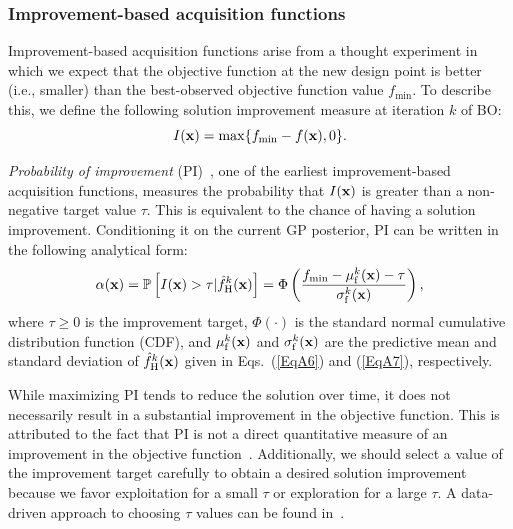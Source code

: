 \documentclass[iicol,sn-basic]{sn-jnl}%
\newcommand{\edit}[1]{\textcolor{red}{#1}} %
\begin{document}
\subsubsection{Improvement-based acquisition functions}\label{Sec511}

Improvement-based acquisition functions arise from a thought experiment in which we expect that the objective function at the new design point is better (i.e., smaller) than the best-observed objective function value $f_\text{min}$.
To describe this, we define the following solution improvement measure at iteration $k$ of BO:
\begin{equation}\label{Eq40}
	I({\bf x}) = \max\{f_\text{min}-f({\bf x}),0\}.
\end{equation}

\textit{Probability of improvement} (PI)~\citep{Kushner1964}, one of the earliest improvement-based acquisition functions, measures the probability that $I({\bf x})$ is greater than a non-negative target value $\tau$.
This is equivalent to the chance of having a solution improvement.
Conditioning it on the current GP posterior, PI can be written in the following analytical form:
\begin{equation}\label{Eq41}
	\alpha({\bf x}) = \mathbb{P}\left[I({\bf x})>\tau|\hat{f}_\text{H}^k({\bf x})\right]=\Phi\left(\frac{f_\text{min}-\mu_\text{f}^k({\bf x})-\tau}{\sigma_\text{f}^k({\bf x})}\right),
\end{equation}
where %
{$\tau \geq 0$ is the improvement target}, $\Phi(\cdot)$ is the standard normal cumulative distribution function (CDF), and $\mu_\text{f}^k({\bf x})$ and $\sigma_\text{f}^k({\bf x})$ are the predictive mean and standard deviation of $\hat{f}_\text{H}^k({\bf x})$ given in Eqs.~(\ref{EqA6}) and (\ref{EqA7}), respectively.

While maximizing PI tends to reduce the solution over time, it does not necessarily result in a substantial improvement in the objective function.
This is attributed to the fact that PI is not a direct quantitative measure of an improvement in the objective function~\citep{Kochenderfer2019}.
{Additionally, we should select a value of the improvement target carefully to obtain a desired solution improvement because we favor exploitation for a small $\tau$ or exploration for a large $\tau$.
A data-driven approach to choosing $\tau$ values can be found in~\cite{Jones2001}.}
\end{document}

